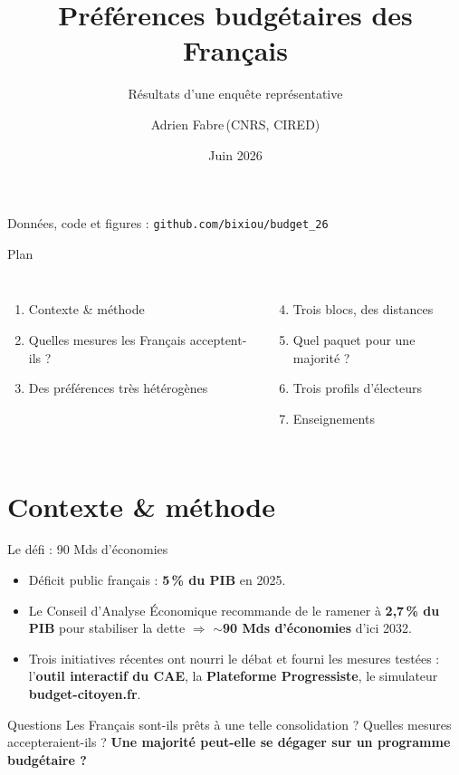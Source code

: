 \documentclass[11pt,aspectratio=169,french]{beamer}
\title{Préférences budgétaires des Français}
\subtitle{Résultats d'une enquête représentative}
\author{Adrien Fabre\,\footnotesize(CNRS, CIRED)}
\date{Juin 2026}
\begin{document}
\begin{frame}[plain]
  \titlepage
  \begin{center}\footnotesize\color{gray}
    Données, code et figures : \texttt{github.com/bixiou/budget\_26}
  \end{center}
\end{frame}

\begin{frame}{Plan}
  \begin{columns}[T]
    \begin{enumerate}
      \item Contexte \& méthode
      \item Quelles mesures les Français acceptent-ils ?
      \item Des préférences très hétérogènes
    \end{enumerate}
    \begin{enumerate}\setcounter{enumi}{3}
      \item Trois blocs, des distances
      \item Quel paquet pour une majorité ?
      \item Trois profils d'électeurs
      \item Enseignements
    \end{enumerate}
  \end{columns}
\end{frame}

\section{Contexte \& méthode}

\begin{frame}{Le défi : 90 Mds d'économies}
  \begin{itemize}
    \item Déficit public français : \textbf{5\,\% du PIB} en 2025.
    \item Le Conseil d'Analyse Économique recommande de le ramener à \textbf{2,7\,\% du PIB}
          pour stabiliser la dette $\Rightarrow$ \textbf{$\sim$90 Mds d'économies} d'ici 2032.
    \item Trois initiatives récentes ont nourri le débat et fourni les mesures testées :
          l'\textbf{outil interactif du CAE}, la \textbf{Plateforme Progressiste},
          le simulateur \textbf{budget-citoyen.fr}.
  \end{itemize}
  \vfill
  \begin{block}{Questions}
    Les Français sont-ils prêts à une telle consolidation ? Quelles mesures accepteraient-ils ?
    \textbf{Une majorité peut-elle se dégager sur un programme budgétaire ?}
  \end{block}
\end{frame}
\end{document}
